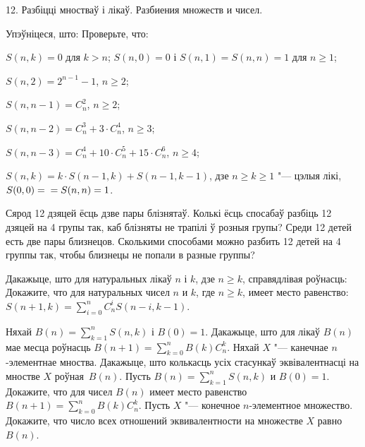 



\biLangHeader
{12. Разбіцці мностваў і лікаў.}
{Разбиения множеств и чисел.}

\begin{problemList}

\problemItemWithCommonPart
{Упэўніцеся, што:}
{Проверьте, что:}
{%
\begin{belarusianEnumerate}
    \item $S(n, k) = 0$ для $k > n$; $S(n, 0) = 0$ і $S(n, 1) = S(n, n) = 1$ для $n \ge 1$;
    \item $S(n, 2) = 2^{n - 1} - 1$, $n \ge 2$;
    \item $S(n, n - 1) = C_n^2$, $n \ge 2$;
    \item $S(n, n - 2) = C_n^3 + 3 \cdot C_n^4$, $n \ge 3$;
    \item $S(n, n - 3) = C_n^4 + 10 \cdot C_n^5 + 15 \cdot C_n^6$, $n \ge 4$;
    \item $S(n, k) = k \cdot S(n - 1, k) + S(n - 1, k - 1)$, дзе $n \ge k \ge 1$ "--- цэлыя лікі,
    $S(0, 0) = \\ = S(n, n) = 1$.
\end{belarusianEnumerate}
}

\smallskip

\problemItemSimple
{Сярод 12 дзяцей ёсць дзве пары блізнятаў. Колькі ёсць спосабаў разбіць 12 дзяцей
на 4 групы так, каб блізняты не трапілі ў розныя групы?}
{Среди 12 детей есть две пары близнецов. Сколькими способами можно разбить
12 детей на 4 группы так, чтобы близнецы не попали в разные группы?}

\bigskip

\problemItemWithCommonPart
{Дакажыце, што для натуральных лікаў $n$ і $k$, дзе $n \ge k$,
справядлівая роўнасць:}
{Докажите, что для натуральных чисел $n$ и $k$, где $n \ge k$,
имеет место равенство:}
{$S(n + 1, k) = \sum\limits_{i = 0}^n C_n^i S(n - i, k - 1)$.}

\bigskip

\problemItemSimple
{Няхай $B(n) = \sum\limits_{k = 1}^n S(n, k)$ і $B(0) = 1$. Дакажыце,
што для лікаў $B(n)$ мае месца роўнасць $B(n + 1) = \sum\limits_{k = 0}^n B(k)C_n^k$.
Няхай $X$ "--- канечнае $n$-элементнае мноства. Дакажыце, што колькасць усіх
стасункаў эквівалентнасці на мностве $X$ роўная~$B(n)$.}
{Пусть $B(n) = \sum\limits_{k = 1}^n S(n, k)$ и $B(0) = 1$. Докажите,
что для чисел $B(n)$ имеет место равенство $B(n + 1) = \sum\limits_{k = 0}^n B(k)C_n^k$.
Пусть $X$ "--- конечное $n$-элементное множество. Докажите, что число всех
отношений эквивалентности на множестве $X$ равно~$B(n)$.}


\end{problemList}
